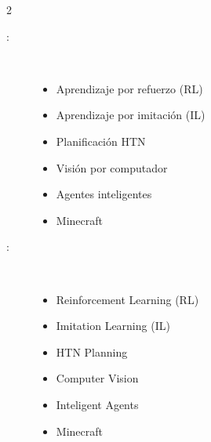 \begin{multicols}{2}
\begin{description}
\item [\palabraschaveprincipal:] \mbox{} \\[-20pt]
    \begin{itemize}
        \item Aprendizaje por refuerzo (RL)
        \item Aprendizaje por imitación (IL)
        \item Planificación HTN
        \item Visión por computador
        \item Agentes inteligentes
        \item Minecraft
  \end{itemize}
\end{description}
\begin{description}
\item [\palabraschavesecundaria:] \mbox{} \\[-20pt]
    \begin{itemize}
        \item Reinforcement Learning (RL)
        \item Imitation Learning (IL)
        \item HTN Planning
        \item Computer Vision
        \item Inteligent Agents
        \item Minecraft
  \end{itemize}
\end{description}
\end{multicols}
